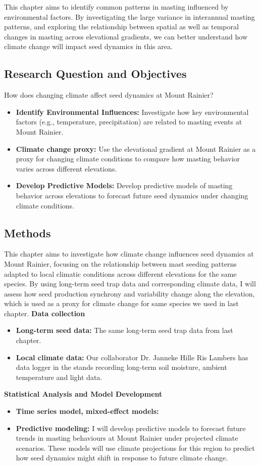 \documentclass[11pt,letter]{article}
\begin{document}
This chapter aims to identify common patterns in masting influenced by environmental factors. By investigating the large variance in interannual masting patterns, and exploring the relationship between spatial as well as temporal changes in masting across elevational gradients, we can better understand how climate change will impact seed dynamics in this area.\par

\subsection{Research Question and Objectives}
How does changing climate affect seed dynamics at Mount Rainier?
\begin{itemize}
\item\textbf{Identify Environmental Influences:} Investigate how key environmental factors (e.g., temperature, precipitation) are related to masting events at Mount Rainier.
\item\textbf{Climate change proxy:} Use the elevational gradient at Mount Rainier as a proxy for changing climate conditions to compare how masting behavior varies across different elevations.
\item\textbf{Develop Predictive Models:} Develop predictive models of masting behavior across elevations to forecast future seed dynamics under changing climate conditions.
\end{itemize}
\subsection{Methods}
This chapter aims to investigate how climate change influences seed dynamics at Mount Rainier, focusing on the relationship between mast seeding patterns adapted to local climatic conditions across different elevations for the same species. By using long-term seed trap data and corresponding climate data, I will assess how seed production synchrony and variability change along the elevation, which is used as a proxy for climate change for same species we used in last chapter.
\textbf{Data collection}\\
\begin{itemize}
\item\textbf{Long-term seed data:} The same long-term seed trap data from last chapter.
\item\textbf{Local climate data:}  Our collaborator Dr. Janneke Hille Ris Lambers has data logger in the stands recording long-term soil moisture, ambient temperature and light data.
\end{itemize}
\textbf{Statistical Analysis and Model Development}\\
\begin{itemize}
\item\textbf{Time series model, mixed-effect models:}
\item\textbf{Predictive modeling:} I will develop predictive models to forecast future trends in masting behaviours at Mount Rainier under projected climate scenarios. These models will use climate projections for this region to predict how seed dynamics might shift in response to future climate change.
\end{itemize}
\end{document}
